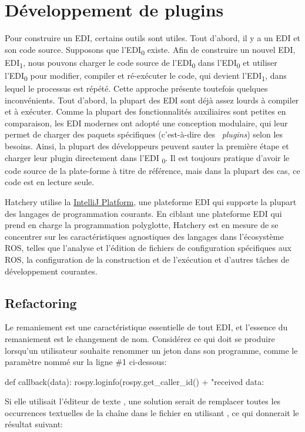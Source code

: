 \section{Développement de plugins}

Pour construire un EDI, certains outils sont utiles. Tout d'abord, il y a un EDI et son code source. Supposons que l'EDI\textsubscript{0} existe. Afin de construire un nouvel EDI, EDI\textsubscript{1}, nous pouvons charger le code source de l'EDI\textsubscript{0} dans l'EDI\textsubscript{0} et utiliser l'EDI\textsubscript{0} pour modifier, compiler et ré-exécuter le code, qui devient l'EDI\textsubscript{1}, dans lequel le processus est répété. Cette approche présente toutefois quelques inconvénients. Tout d'abord, la plupart des EDI sont déjà assez lourds à compiler et à exécuter. Comme la plupart des fonctionnalités auxiliaires sont petites en comparaison, les EDI modernes ont adopté une conception modulaire, qui leur permet de charger des paquets spécifiques (c'est-à-dire des \ \textit{plugins}) selon les besoins. Ainsi, la plupart des développeurs peuvent sauter la première étape et charger leur plugin directement dans l'EDI \textsubscript{0}. Il est toujours pratique d'avoir le code source de la plate-forme à titre de référence, mais dans la plupart des cas, ce code est en lecture seule.

Hatchery utilise la \href{https://www.jetbrains.org/intellij/sdk/docs/}{IntelliJ Platform}, une plateforme EDI qui supporte la plupart des langages de programmation courants. En ciblant une plateforme EDI qui prend en charge la programmation polyglotte, Hatchery est en mesure de se concentrer sur les caractéristiques agnostiques des langages dans l'écosystème ROS, telles que l'analyse et l'édition de fichiers de configuration spécifiques aux ROS, la configuration de la construction et de l'exécution et d'autres tâches de développement courantes.

\subsection{Refactoring}\label{subsec:refactoring}

Le remaniement est une caractéristique essentielle de tout EDI, et l'essence du remaniement est le changement de nom. Considérez ce qui doit se produire lorsqu'un utilisateur souhaite renommer un jeton dans son programme, comme le paramètre nommé  sur la ligne \#1 ci-dessous:
%
\begin{pythonlisting}
def callback(data):
    rospy.loginfo(rospy.get_caller_id() + "received data: %
\end{pythonlisting}
%
Si elle utilisait l'éditeur de texte , une solution serait de remplacer toutes les occurrences textuelles de la chaîne  dans le fichier en utilisant , ce qui donnerait le résultat suivant:

